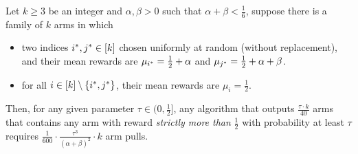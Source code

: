 \begin{lemma}
	\label{lem:arm-trapping}
	Let $k\geq 3$ be an integer and $\alpha, \beta >0$ such that $\alpha+\beta<\frac{1}{6}$, suppose there is a family of $k$ arms in which
	\begin{itemize}
		\item two indices $i^{*}, j^{*} \in [k]$ chosen uniformly at random (without replacement), and their mean rewards are $\mu_{i^{*}}=\frac{1}{2}+\alpha$ and $\mu_{j^{*}}=\frac{1}{2}+\alpha+\beta$.
		\item for all $i \in [k]\setminus \{i^{*}, j^{*}\}$, their mean rewards are $\mu_{i}=\frac{1}{2}$.
	\end{itemize}
	Then, for any given parameter $\tau\in (0, \frac{1}{2}]$, any algorithm that outputs $\frac{\tau\cdot k}{40}$ arms that contains any arm with reward \emph{strictly more than} $\frac{1}{2}$ with probability at least $\tau$ requires $\frac{1}{600}\cdot \frac{\tau^3}{(\alpha+\beta)^2}\cdot k$ arm pulls.
\end{lemma}
